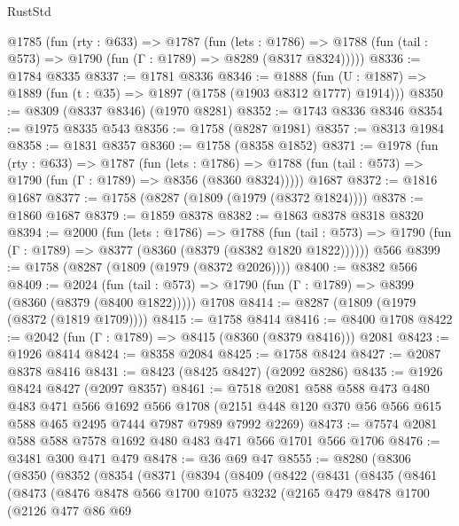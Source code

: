 \begin{lexlean}{RustStd}
\begin{coremodule}
  @1785
    (fun (rty : @633) =>
    @1787
      (fun (lets : @1786) =>
      @1788 (fun (tail : @573) => @1790 (fun (Γ : @1789) => @8289 (@8317 @8324)))))
@8336 := @1784 @8335
@8337 := @1781 @8336
@8346 := @1888 (fun (U : @1887) => @1889 (fun (t : @35) => @1897 (@1758 (@1903 @8312 @1777) @1914)))
@8350 := @8309 (@8337 @8346) (@1970 @8281)
@8352 := @1743 @8336 @8346
@8354 := @1975 @8335 @543
@8356 := @1758 (@8287 @1981)
@8357 := @8313 @1984
@8358 := @1831 @8357
@8360 := @1758 (@8358 @1852)
@8371 := @1978
    (fun (rty : @633) =>
    @1787
      (fun (lets : @1786) =>
      @1788 (fun (tail : @573) => @1790 (fun (Γ : @1789) => @8356 (@8360 @8324)))))
    @1687
@8372 := @1816 @1687
@8377 := @1758 (@8287 (@1809 (@1979 (@8372 @1824))))
@8378 := @1860 @1687
@8379 := @1859 @8378
@8382 := @1863 @8378 @8318 @8320
@8394 := @2000
    (fun (lets : @1786) =>
    @1788
      (fun (tail : @573) => @1790 (fun (Γ : @1789) => @8377 (@8360 (@8379 (@8382 @1820 @1822))))))
    @566
@8399 := @1758 (@8287 (@1809 (@1979 (@8372 @2026))))
@8400 := @8382 @566
@8409 := @2024
    (fun (tail : @573) => @1790 (fun (Γ : @1789) => @8399 (@8360 (@8379 (@8400 @1822)))))
    @1708
@8414 := @8287 (@1809 (@1979 (@8372 (@1819 @1709))))
@8415 := @1758 @8414
@8416 := @8400 @1708
@8422 := @2042 (fun (Γ : @1789) => @8415 (@8360 (@8379 @8416))) @2081
@8423 := @1926 @8414
@8424 := @8358 @2084
@8425 := @1758 @8424
@8427 := @2087 @8378 @8416
@8431 := @8423 (@8425 @8427) (@2092 @8286)
@8435 := @1926 @8424 @8427 (@2097 @8357)
@8461 := @7518
    @2081
    @588
    @588
    @473
    @480
    @483
    @471
    @566
    @1692
    @566
    @1708
    (@2151 @448 @120 @370 @56 @566 @615 @588 @465 @2495 @7444 @7987 @7989 @7992 @2269)
@8473 := @7574 @2081 @588 @588 @7578 @1692 @480 @483 @471 @566 @1701 @566 @1706
@8476 := @3481 @300 @471 @479
@8478 := @36 @69 @47
@8555 := @8280
    (@8306
      (@8350
        (@8352
          (@8354
            (@8371
              (@8394
                (@8409
                  (@8422
                    (@8431
                      (@8435
                        (@8461
                          (@8473
                            (@8476
                              @8478
                              @566
                              @1700
                              @1075
                              @3232
                              (@2165
                                @479
                                @8478
                                @1700
                                (@2126
                                  @477
                                  @86
                                  @69

\end{coremodule}
\end{lexlean}
